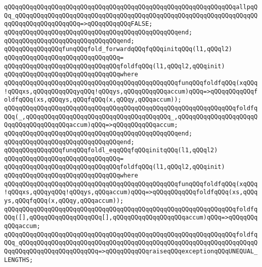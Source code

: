 \verb|qQQqqQQqqQQqqQQqqQQqqQQqqQQqqQQqqQQqqQQqqQQqqQQqqQQqqQQqqQQqqQQqallpqQQq_qQQqqQQqqQQqqQQqqQQqqQQqqQQqqQQqqQQqqQQqqQQqqQQqqQQqqQQqqQQqqQQqqQQqqQQqqQQqqQQqqQQqqQQq=>qQQqqQQqqQQqFALSE;|\newline
\verb|qQQqqQQqqQQqqQQqqQQqqQQqqQQqqQQqqQQqqQQqqQQqqQQqend;|\newline
\verb|qQQqqQQqqQQqqQQqqQQqqQQqqQQqqQQqend;|\newline
\newline
\verb|qQQqqQQqqQQqqQQqfunqQQqfold_forwardqQQqfqQQqinitqQQq(l1,qQQql2)|\newline
\verb|qQQqqQQqqQQqqQQqqQQqqQQqqQQqqQQq=|\newline
\verb|qQQqqQQqqQQqqQQqqQQqqQQqqQQqqQQqfoldfqQQq(l1,qQQql2,qQQqinit)|\newline
\verb|qQQqqQQqqQQqqQQqqQQqqQQqqQQqqQQqwhere|\newline
\verb|qQQqqQQqqQQqqQQqqQQqqQQqqQQqqQQqqQQqqQQqqQQqqQQqfunqQQqfoldfqQQq(xqQQq!qQQqxs,qQQqqQQqqQQqyqQQq!qQQqys,qQQqqQQqqQQqaccum)qQQq=>qQQqqQQqqQQqfoldfqQQq(xs,qQQqys,qQQqfqQQq(x,qQQqy,qQQqaccum));|\newline
\verb|qQQqqQQqqQQqqQQqqQQqqQQqqQQqqQQqqQQqqQQqqQQqqQQqqQQqqQQqqQQqqQQqfoldfqQQq(_,qQQqqQQqqQQqqQQqqQQqqQQqqQQqqQQqqQQqqQQq_,qQQqqQQqqQQqqQQqqQQqqQQqqQQqqQQqqQQqqQQqaccum)qQQq=>qQQqqQQqqQQqaccum;|\newline
\verb|qQQqqQQqqQQqqQQqqQQqqQQqqQQqqQQqqQQqqQQqqQQqqQQqend;|\newline
\verb|qQQqqQQqqQQqqQQqqQQqqQQqqQQqqQQqend;|\newline
\newline
\verb|qQQqqQQqqQQqqQQqfunqQQqfoldl_eqqQQqfqQQqinitqQQq(l1,qQQql2)|\newline
\verb|qQQqqQQqqQQqqQQqqQQqqQQqqQQqqQQq=|\newline
\verb|qQQqqQQqqQQqqQQqqQQqqQQqqQQqqQQqfoldfqQQq(l1,qQQql2,qQQqinit)|\newline
\verb|qQQqqQQqqQQqqQQqqQQqqQQqqQQqqQQqwhere|\newline
\verb|qQQqqQQqqQQqqQQqqQQqqQQqqQQqqQQqqQQqqQQqqQQqqQQqfunqQQqfoldfqQQq(xqQQq!qQQqxs,qQQqyqQQq!qQQqys,qQQqaccum)qQQq=>qQQqqQQqqQQqfoldfqQQq(xs,qQQqys,qQQqfqQQq(x,qQQqy,qQQqaccum));|\newline
\verb|qQQqqQQqqQQqqQQqqQQqqQQqqQQqqQQqqQQqqQQqqQQqqQQqqQQqqQQqqQQqqQQqfoldfqQQq([],qQQqqQQqqQQqqQQqqQQq[],qQQqqQQqqQQqqQQqqQQqaccum)qQQq=>qQQqqQQqqQQqaccum;|\newline
\verb|qQQqqQQqqQQqqQQqqQQqqQQqqQQqqQQqqQQqqQQqqQQqqQQqqQQqqQQqqQQqqQQqfoldfqQQq_qQQqqQQqqQQqqQQqqQQqqQQqqQQqqQQqqQQqqQQqqQQqqQQqqQQqqQQqqQQqqQQqqQQqqQQqqQQqqQQqqQQqqQQqqQQq=>qQQqqQQqqQQqraiseqQQqexceptionqQQqUNEQUAL_LENGTHS;|\newline
